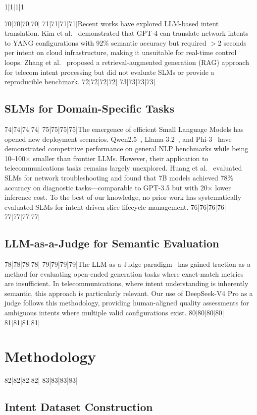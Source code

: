 1|1|1|1|\documentclass[10pt,conference]{IEEEtran}
\begin{document}
70|70|70|70|
71|71|71|71|Recent works have explored LLM-based intent translation. Kim et al.~\cite{kim2024} demonstrated that GPT-4 can translate network intents to YANG configurations with 92\% semantic accuracy but required $>$2 seconds per intent on cloud infrastructure, making it unsuitable for real-time control loops. Zhang et al.~\cite{zhang2024} proposed a retrieval-augmented generation (RAG) approach for telecom intent processing but did not evaluate SLMs or provide a reproducible benchmark.
72|72|72|72|
73|73|73|73|\subsection{SLMs for Domain-Specific Tasks}
74|74|74|74|
75|75|75|75|The emergence of efficient Small Language Models has opened new deployment scenarios. Qwen2.5~\cite{qwen25}, Llama-3.2~\cite{llama32}, and Phi-3~\cite{phi3} have demonstrated competitive performance on general NLP benchmarks while being 10--100$\times$ smaller than frontier LLMs. However, their application to telecommunications tasks remains largely unexplored. Huang et al.~\cite{huang2024} evaluated SLMs for network troubleshooting and found that 7B models achieved 78\% accuracy on diagnostic tasks---comparable to GPT-3.5 but with 20$\times$ lower inference cost. To the best of our knowledge, no prior work has systematically evaluated SLMs for intent-driven slice lifecycle management.
76|76|76|76|
77|77|77|77|\subsection{LLM-as-a-Judge for Semantic Evaluation}
78|78|78|78|
79|79|79|79|The LLM-as-a-Judge paradigm~\cite{zheng2023} has gained traction as a method for evaluating open-ended generation tasks where exact-match metrics are insufficient. In telecommunications, where intent understanding is inherently semantic, this approach is particularly relevant. Our use of DeepSeek-V4 Pro as a judge follows this methodology, providing human-aligned quality assessments for ambiguous intents where multiple valid configurations exist.
80|80|80|80|
81|81|81|81|\section{Methodology}
82|82|82|82|
83|83|83|83|\subsection{Intent Dataset Construction}
\end{document}
